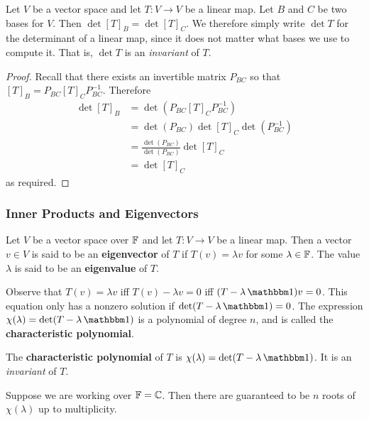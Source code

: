 \begin{thm}Let $V$ be a vector space and let $T : V \to V$ be a linear map. Let $B$ and $C$ be two bases for $V$. Then $\det [T]_B = \det [T]_C$. We therefore simply write $\det T$ for the determinant of a linear map, since it does not matter what bases we use to compute it. That is, $\det T$ is an \textit{invariant} of $T$.
\end{thm}
\begin{proof}
Recall that there exists an invertible matrix $P_{BC}$ so that $[T]_{B} = P_{BC} [T]_{C} P_{BC}^{-1}$. Therefore 
\begin{align*}\det [T]_B &= \det(P_{BC} [T]_{C} P_{BC}^{-1} ) \\&= \det (P_{BC}) \det [T]_{C} \det( P_{BC}^{-1}) \\
&= \frac{\det (P_{BC})}{\det (P_{BC})} \det [T]_{C} \\
&= \det [T]_C
\end{align*}
as required.
\end{proof}

\subsubsection{Inner Products and Eigenvectors}
\begin{defn}[Eigenvector]
    Let $V$ be a vector space over $\operatorname{\mathbb{F}}$ and let $T : V \to V$ be a linear map. Then a vector $v \in V$ is said to be an \textbf{eigenvector} of $T$ if $T(v) = \lambda v$ for some $\lambda \in \operatorname{\mathbb{F}}$. The value $\lambda$ is said to be an \textbf{eigenvalue} of $T$.
\end{defn}
\begin{remark*}
    Observe that $T(v) = \lambda v$ iff $T(v)-\lambda v = 0$ iff $(T-\lambda \One)v = 0$. This equation only has a nonzero solution if $\det (T-\lambda\One)=0$. The expression $\chi(\lambda)=\det(T-\lambda\One)$ is a polynomial of degree $n$, and is called the \textbf{characteristic polynomial}. 
\end{remark*}

\begin{defn}
The \textbf{characteristic polynomial} of $T$ is $\chi(\lambda) = \det(T-\lambda \One)$. It is an \textit{invariant} of $T$.
\end{defn}

Suppose we are working over $\operatorname{\mathbb{F}}=\operatorname{\mathbb{C}}$. Then there are guaranteed to be $n$ roots of $\chi(\lambda)$ up to multiplicity.

